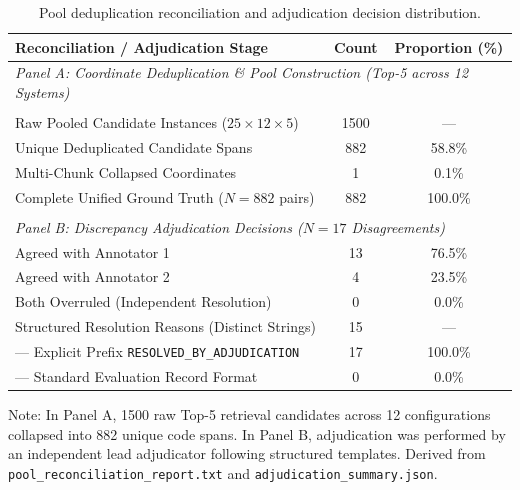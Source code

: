 \begin{table}[t]
\caption{Pool deduplication reconciliation and adjudication decision distribution.}
\label{tab:pool_reconciliation_adjudication}
\centering\footnotesize
\setlength{\tabcolsep}{10pt}
\begin{threeparttable}
\begin{tabular}{@{}lcc@{}}
\toprule
Reconciliation / Adjudication Stage & Count & Proportion (\%) \\
\midrule
\multicolumn{3}{l}{\textit{Panel A: Coordinate Deduplication \& Pool Construction (Top-5 across 12 Systems)}} \\\\[2pt]
Raw Pooled Candidate Instances ($25 \times 12 \times 5$) & 1500 & --- \\
Unique Deduplicated Candidate Spans & 882 & 58.8\% \\
Multi-Chunk Collapsed Coordinates & 1 & 0.1\% \\
Complete Unified Ground Truth ($N=882$ pairs) & 882 & 100.0\% \\\\[2pt]
\midrule
\multicolumn{3}{l}{\textit{Panel B: Discrepancy Adjudication Decisions ($N=17$ Disagreements)}} \\[2pt]
Agreed with Annotator 1 & 13 & 76.5\% \\
Agreed with Annotator 2 & 4 & 23.5\% \\
Both Overruled (Independent Resolution) & 0 & 0.0\% \\
Structured Resolution Reasons (Distinct Strings) & 15 & --- \\
--- Explicit Prefix \texttt{RESOLVED\_BY\_ADJUDICATION} & 17 & 100.0\% \\
--- Standard Evaluation Record Format & 0 & 0.0\% \\
\bottomrule
\end{tabular}
\begin{tablenotes}\footnotesize
\item[] Note: In Panel A, 1500 raw Top-5 retrieval candidates across 12 configurations collapsed into 882 unique code spans. In Panel B, adjudication was performed by an independent lead adjudicator following structured templates. Derived from \texttt{pool\_reconciliation\_report.txt} and \texttt{adjudication\_summary.json}.
\end{tablenotes}
\end{threeparttable}
\end{table}